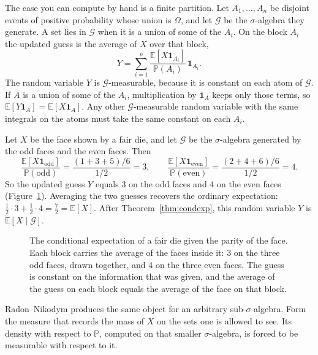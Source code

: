 The case you can compute by hand is a finite partition. Let $A_1,\dots,A_n$ be disjoint events of positive probability whose union is $\Omega$, and let $\mathcal G$ be the $\sigma$-algebra they generate. A set lies in $\mathcal G$ when it is a union of some of the $A_i$. On the block $A_i$ the updated guess is the average of $X$ over that block,
\[
Y=\sum_{i=1}^n\frac{\mathbb E[X\mathbf 1_{A_i}]}{\mathbb P(A_i)}\,\mathbf 1_{A_i}.
\]
The random variable $Y$ is $\mathcal G$-measurable, because it is constant on each atom of $\mathcal G$. If $A$ is a union of some of the $A_i$, multiplication by $\mathbf 1_A$ keeps only those terms, so $\mathbb E[Y\mathbf 1_A]=\mathbb E[X\mathbf 1_A]$. Any other $\mathcal G$-measurable random variable with the same integrals on the atoms must take the same constant on each $A_i$.

\begin{example}\label{ex:die}
Let $X$ be the face shown by a fair die, and let $\mathcal G$ be the $\sigma$-algebra generated by the odd faces and the even faces. Then
\[
\frac{\mathbb E[X\mathbf 1_{\mathrm{odd}}]}{\mathbb P(\mathrm{odd})}=\frac{(1+3+5)/6}{1/2}=3,\qquad
\frac{\mathbb E[X\mathbf 1_{\mathrm{even}}]}{\mathbb P(\mathrm{even})}=\frac{(2+4+6)/6}{1/2}=4.
\]
So the updated guess $Y$ equals $3$ on the odd faces and $4$ on the even faces (Figure~\ref{fig:partition}). Averaging the two guesses recovers the ordinary expectation: $\frac12\cdot3+\frac12\cdot4=\frac72=\mathbb E[X]$. After Theorem~\ref{thm:condexp}, this random variable $Y$ is $\mathbb E[X\mid\mathcal G]$.
\end{example}

\begin{figure}[ht]
\centering
{}
\caption{The conditional expectation of a fair die given the parity of the face. Each block carries the average of the faces inside it: $3$ on the three odd faces, drawn together, and $4$ on the three even faces. The guess is constant on the information that was given, and the average of the guess on each block equals the average of the face on that block.}
\label{fig:partition}
\end{figure}

Radon--Nikodym produces the same object for an arbitrary sub-$\sigma$-algebra. Form the measure that records the mass of $X$ on the sets one is allowed to see. Its density with respect to $\mathbb P$, computed on that smaller $\sigma$-algebra, is forced to be measurable with respect to it.

